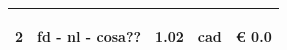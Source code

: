 \documentclass[a4paper]{article}
\begin{document}
\begin{tabular}{ | L{10mm} |  L{86mm} | L{12mm} | L{12mm} | L{16mm} | }
                                   
                                     \vspace{2.5mm}
                                     \begin{spacing}{0}
                                  2
                                     \end{spacing} &
                                     \vspace{2.5mm}
                                     \begin{spacing}{0}
                                  fd - nl - \newline cosa??
                                     \end{spacing} &
                                     \vspace{2.5mm}
                                     \begin{spacing}{0}
                                  1.02
                                     \end{spacing} &
                                     \vspace{2.5mm}
                                     \begin{spacing}{0}
                                  cad
                                     \end{spacing} &
                                     \vspace{2.5mm}
                                     \begin{spacing}{0}
                                       \euro\hfill 
                                   0.0
                                     \end{spacing} \\
                                     \hline
    

\end{tabular}
\end{document}
